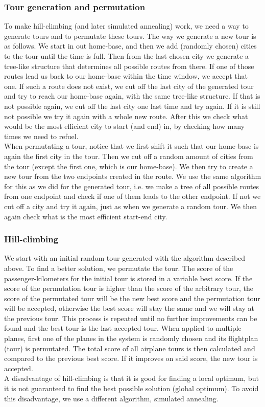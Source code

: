 \documentclass[journal]{IEEEtran}
\begin{document}
\subsubsection{Tour generation and permutation}
To make hill-climbing (and later simulated annealing) work, we need a way to generate tours and to permutate these tours. The way we generate a new tour is as follows. We start in out home-base, and then we add (randomly chosen) cities to the tour until the time is full. Then from the last chosen city we generate a tree-like structure that determines all possible routes from there. If one of those routes lead us back to our home-base within the time window, we accept that one. If such a route does not exist, we cut off the last city of the generated tour and try to reach our home-base again, with the same tree-like structure. If that is not possible again, we cut off the last city one last time and try again. If it is still not possible we try it again with a whole new route. After this we check what would be the most efficient city to start (and end) in, by checking how many times we need to refuel. \\
When permutating a tour, notice that we first shift it such that our home-base is again the first city in the tour. Then we cut off a random amount of cities from the tour (except the first one, which is our home-base). We then try to create a new tour from the two endpoints created in the route. We use the same algorithm for this as we did for the generated tour, i.e. we make a tree of all possible routes from one endpoint and check if one of them leads to the other endpoint. If not we cut off a city and try it again, just as when we generate a random tour. We then again check what is the most efficient start-end city.

\subsubsection{Hill-climbing}
We start with an initial random tour generated with the algorithm described above. To find a better solution, we permutate the tour. The score of the passenger-kilometers for the initial tour is stored in a variable best score. If the score of the permutation tour is higher than the score of the arbitrary tour, the score of the permutated tour will be the new best score and the permutation tour will be accepted, otherwise the best score will stay the same and we will stay at the previous tour. This process is repeated until no further improvements can be found and the best tour is the last accepted tour. When applied to multiple planes, first one of the planes in the system is randomly chosen and its flightplan (tour) is permutated. The total score of all airplane tours is then calculated and compared to the previous best score. If it improves on said score, the new tour is accepted.\\
A disadvantage of hill-climbing is that it is good for finding a local optimum, but it is not guaranteed to find the best possible solution (global optimum). To avoid this disadvantage, we use a different algorithm, simulated annealing. \\
\end{document}
